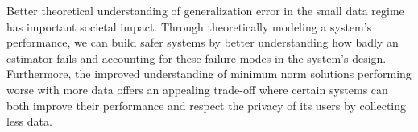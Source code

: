 \documentclass[11pt]{article}
\begin{document}
  Better theoretical understanding of generalization error in the small data
  regime has important societal impact. Through theoretically modeling a system's
  performance, we can build safer systems by better understanding how badly an
  estimator fails and accounting for these failure modes in the system's design.
  Furthermore, the improved understanding of minimum norm solutions performing
  worse with more data offers an appealing trade-off where certain systems can
  both improve their performance and respect the privacy of its users by
  collecting less data.
\fi


\ifisarxiv
  
\else
  
\fi





% 
\end{document}
